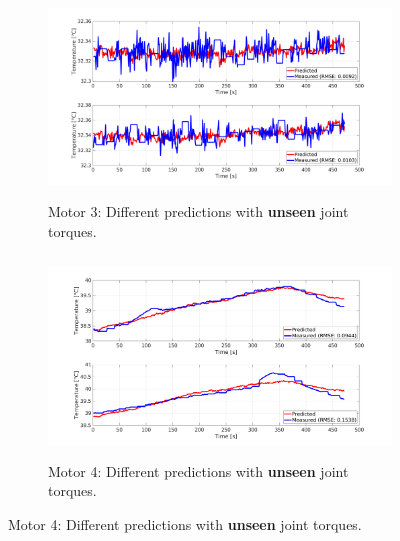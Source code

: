\documentclass{ifacconf}
\begin{document}
\begin{figure}[t!]
    \begin{subfigure}[t]{0.5\textwidth}
		\centering
		\includegraphics[height=2.1in, width=\linewidth, keepaspectratio]{./pictures/applications/feedback/new/j3_legend_rmse_l_20.png}
		\caption{Motor 3: Different predictions with \textbf{unseen} joint torques.}
	\end{subfigure}%
	\begin{subfigure}[t]{0.5\textwidth}
		\centering
		\includegraphics[height=2.1in, width=\linewidth, keepaspectratio]{./pictures/applications/feedback/new/j4_legend_rmse_l_20.png}
		\caption{Motor 4: Different predictions with \textbf{unseen} joint torques.}
	\end{subfigure}

    \vspace{1ex} 


\end{figure}
\end{document}
